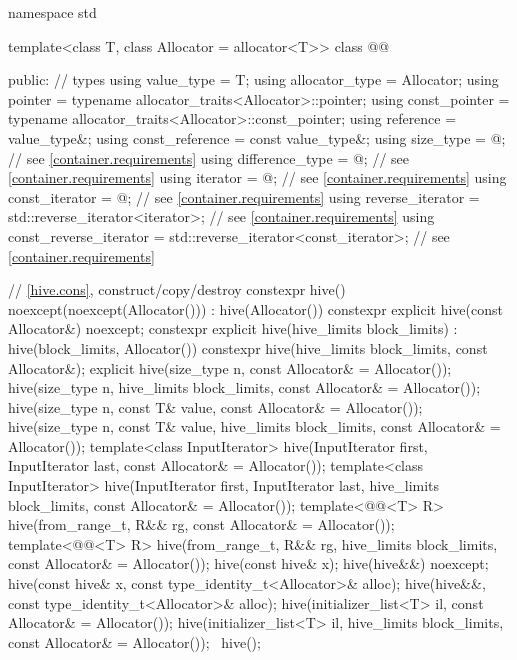 \begin{codeblock}
namespace std {
  template<class T, class Allocator = allocator<T>>
  class @@ {
  public:
    // types
    using value_type = T;
    using allocator_type = Allocator;
    using pointer = typename allocator_traits<Allocator>::pointer;
    using const_pointer = typename allocator_traits<Allocator>::const_pointer;
    using reference = value_type&;
    using const_reference = const value_type&;
    using size_type = @\impdef@;                               // see \ref{container.requirements}
    using difference_type = @\impdef@;                         // see \ref{container.requirements}
    using iterator = @\impdef@;                                // see \ref{container.requirements}
    using const_iterator = @\impdef@;                          // see \ref{container.requirements}
    using reverse_iterator = std::reverse_iterator<iterator>;               // see \ref{container.requirements}
    using const_reverse_iterator = std::reverse_iterator<const_iterator>;   // see \ref{container.requirements}

    // \ref{hive.cons}, construct/copy/destroy
    constexpr hive() noexcept(noexcept(Allocator())) : hive(Allocator()) {}
    constexpr explicit hive(const Allocator&) noexcept;
    constexpr explicit hive(hive_limits block_limits) : hive(block_limits, Allocator()) {}
    constexpr hive(hive_limits block_limits, const Allocator&);
    explicit hive(size_type n, const Allocator& = Allocator());
    hive(size_type n, hive_limits block_limits, const Allocator& = Allocator());
    hive(size_type n, const T& value, const Allocator& = Allocator());
    hive(size_type n, const T& value, hive_limits block_limits, const Allocator& = Allocator());
    template<class InputIterator>
      hive(InputIterator first, InputIterator last, const Allocator& = Allocator());
    template<class InputIterator>
      hive(InputIterator first, InputIterator last, hive_limits block_limits,
           const Allocator& = Allocator());
    template<@@<T> R>
      hive(from_range_t, R&& rg, const Allocator& = Allocator());
    template<@@<T> R>
      hive(from_range_t, R&& rg, hive_limits block_limits, const Allocator& = Allocator());
    hive(const hive& x);
    hive(hive&&) noexcept;
    hive(const hive& x, const type_identity_t<Allocator>& alloc);
    hive(hive&&, const type_identity_t<Allocator>& alloc);
    hive(initializer_list<T> il, const Allocator& = Allocator());
    hive(initializer_list<T> il, hive_limits block_limits, const Allocator& = Allocator());
    ~hive();

}}
\end{codeblock}
